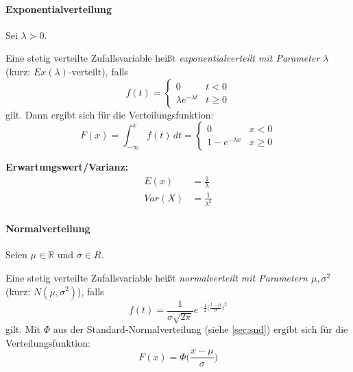 \documentclass[a4paper, 11pt, accentcolor = tud3b]{tudreport}
\newcommand{\R}{\ensuremath{\mathbb{R}}}
\newcommand{\Var}{\ensuremath{\textit{Var}}}
\newcommand{\Ex}{\ensuremath{\textit{Ex}}}
\begin{document}
                    \paragraph{Exponentialverteilung}
                        Sei \( \lambda > 0 \).
                        
                        Eine stetig verteilte Zufallsvariable heißt \textit{exponentialverteilt mit Parameter \(\lambda\)} (kurz: \( \Ex(\lambda) \)-verteilt), falls
                        \begin{equation*}
	                        f(t) =
	                        \begin{cases}
	                        	0                          & t < 0    \\
	                        	\lambda e ^ { -\lambda t } & t \geq 0
	                        \end{cases}
                        \end{equation*}
                        gilt. Dann ergibt sich für die Verteilungsfunktion:
                        \begin{equation*}
	                        F(x) = \int_{-\infty}^{x} \! f(t) \, dt =
	                        \begin{cases}
	                        	0                  & x < 0    \\
	                        	1 - e^{-\lambda x} & x \geq 0
	                        \end{cases}
                        \end{equation*}
                        
                        \textbf{Erwartungswert/Varianz:}
                        \begin{align*}
                        	E(x)    & = \frac{1}{\lambda}   \\
                        	\Var(X) & = \frac{1}{\lambda^2}
                        \end{align*}

                    \paragraph{Normalverteilung}
                        Seien \( \mu \in \R \) und \( \sigma \in R \).
                        
                        Eine stetig verteilte Zufallsvariable heißt \textit{normalverteilt mit Parametern \( \mu, \sigma^2 \)} (kurz: \( N(\mu, \sigma^2) \)), falls
                        \begin{equation*}
	                        f(t) = \frac{1}{\sigma \sqrt{2\pi}} e^{ -\frac{1}{2} \big( \frac{t - \mu}{\sigma} \big) ^ 2 }
                        \end{equation*}
                        gilt. Mit \( \Phi \) aus der Standard-Normalverteilung (siehe \ref{sec:snd}) ergibt sich für die Verteilungsfunktion:
                        \begin{equation*}
	                        F(x) = \Phi\bigg( \frac{x - \mu}{\sigma} \bigg)
                        \end{equation*}
                        
\end{document}
